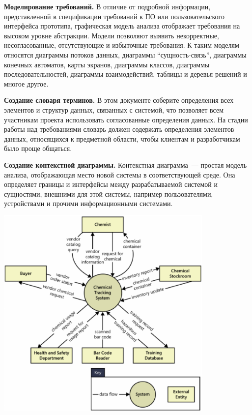 \documentclass{../../text-style}
\begin{document}
\textbf{Моделирование требований.}
В отличие от подробной информации, представленной в спецификации требований к ПО или пользовательского интерфейса прототипа, графическая модель анализа отображает требования на высоком уровне абстракции.
Модели позволяют выявить некорректные, несогласованные, отсутствующие и избыточные требования.
К таким моделям относятся диаграммы потоков данных, диаграммы \enquote{сущность-связь}, диаграммы конечных автоматов, карты экранов, диаграммы классов, диаграммы последовательностей, диаграммы взаимодействий, таблицы и деревья решений и многое другое.

\textbf{Создание словаря терминов.}
В этом документе соберите определения всех элементов и структур данных, связанных с системой, что позволяет всем участникам проекта использовать согласованные определения данных.
На стадии работы над требованиями словарь должен содержать определения элементов данных, относящихся к предметной области, чтобы клиентам и разработчикам было проще общаться.

\textbf{Создание контекстной диаграммы.}
Контекстная диаграмма~--- простая модель анализа, отображающая место новой системы в соответствующей среде.
Она определяет границы и интерфейсы между разрабатываемой системой и сущностями, внешними для этой системы, например пользователями, устройствами и прочими информационными системами.

\begin{center}
    \includegraphics[width=0.8\textwidth]{contextDiagram.png}
\end{center}
\end{document}
